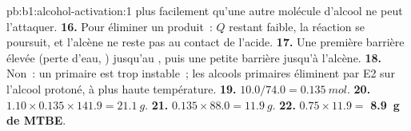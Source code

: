 \begin{solution}{pb:b1:alcohol-activation:1}
plus facilement qu'une autre molécule d'alcool ne peut l'attaquer.
\textbf{16.} Pour éliminer un produit~: $Q$ restant faible, la réaction
se poursuit, et l'alcène ne reste pas au contact de l'acide.
\textbf{17.} Une première barrière élevée (perte d'eau, ) jusqu'au , puis une petite
barrière jusqu'à l'alcène.
\textbf{18.} Non~: un  primaire est trop instable~; les
alcools primaires éliminent par E2 sur l'alcool protoné, à plus haute
température.
\textbf{19.} $10.0/74.0 = \qty{0.135}{mol}$.
\textbf{20.} $1.10 \times 0.135 \times 141.9 = \qty{21.1}{g}$.
\textbf{21.} $0.135 \times 88.0 = \qty{11.9}{g}$.
\textbf{22.} $0.75 \times 11.9 =$ \textbf{\qty{8.9}{g} de MTBE}.
\end{solution}
